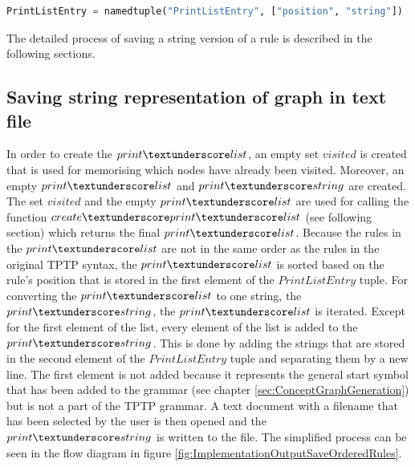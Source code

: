 \begin{lstlisting}[language=Python, basicstyle=\scriptsize	,caption= Print list entry,label= lst:ImplementationOutputPrintListEntry]
PrintListEntry = namedtuple("PrintListEntry", ["position", "string"])
\end{lstlisting}

The detailed process of saving a string version of a rule is described in the following sections.

\subsection{Saving string representation of graph in text file}\label{sec:ImplementationOutputSaveGrammarGraphStringRepresentations}

In order to create the $print\textunderscore list$, an empty set $visited$ is created that is used for memorising which nodes have already been visited. Moreover, an empty $print\textunderscore list$ and $print\textunderscore string$ are created. The set $visited$ and the empty $print\textunderscore list$ are used for calling the function $create\textunderscore print\textunderscore list$ (see following section) which returns the final $print\textunderscore list$. Because the rules in the $print\textunderscore list$ are not in the same order as the rules in the original \ac{TPTP} syntax, the $print\textunderscore list$ is sorted based on the rule's position that is stored in the first element of the $PrintListEntry$ tuple. For converting the $print\textunderscore list$ to one string, the $print\textunderscore string$, the $print\textunderscore list$ is iterated. Except for the first element of the list, every element of the list is added to the $print\textunderscore string$. This is done by adding the strings that are stored in the second element of the $PrintListEntry$ tuple and separating them by a new line. The first element is not added because it represents the general start symbol that has been added to the grammar (see chapter \ref{sec:ConceptGraphGeneration}) but is not a part of the \ac{TPTP} grammar. A text document with a filename that has been selected by the user is then opened and the $print\textunderscore string$ is written to the file.
The simplified process can be seen in the flow diagram in figure \ref{fig:ImplementationOutputSaveOrderedRules}.

